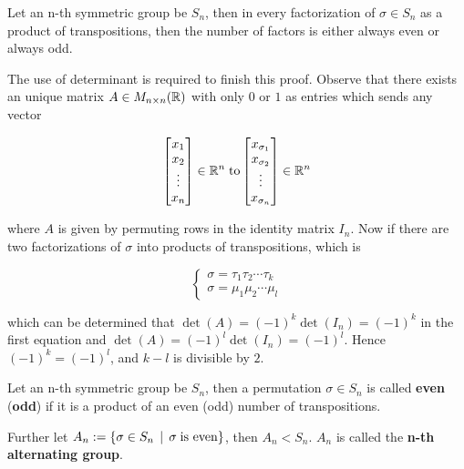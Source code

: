 \documentclass[a4paper,12pt]{article}
\begin{document}
\begin{pst}
  Let an n-th symmetric group be $S_{n}$, then in every factorization of $\sigma\in S_{n}$ as a product of transpositions, then the number of factors is either always even or always odd.\n

  \prf The use of determinant is required to finish this proof. Observe that there exists an unique matrix $A\in M_{n\times n}(\mathbb{R})$ with only $0$ or $1$ as entries which sends any vector

  $$\left[ \begin{matrix}
    x_{1}\\
    x_{2}\\
    \vdots\\
    x_{n}\\
  \end{matrix}\right]\in\mathbb{R}^{n}\;\text{to}\left[ \begin{matrix}
    x_{\sigma_{1}}\\
    x_{\sigma_{2}}\\
    \vdots\\
    x_{\sigma_{n}}\\
  \end{matrix}\right]\in\mathbb{R}^{n}$$\s

  where $A$ is given by permuting rows in the identity matrix $I_{n}$. Now if there are two factorizations of $\sigma$ into products of transpositions, which is

  $$\begin{cases}
    \sigma=\tau_{1}\tau_{2}\cdots\tau_{k}\\
    \sigma=\mu_{1}\mu_{2}\cdots\mu_{l}
  \end{cases}$$\s

  which can be determined that $\det(A)=(-1)^{k}\det(I_{n})=(-1)^{k}$ in the first equation and $\det(A)=(-1)^{l}\det(I_{n})=(-1)^{l}$. Hence $(-1)^{k}=(-1)^{l}$, and $k-l$ is divisible by $2$.
\end{pst}\n

\begin{dft}
  Let an n-th symmetric group be $S_{n}$, then a permutation $\sigma\in S_{n}$ is called \textbf{even} (\textbf{odd}) if it is a product of an even (odd) number of transpositions.\n

  Further let $A_{n}:=\left\{ \sigma\in S_{n}\,\mid\,\sigma\;\text{is even}\right\}$, then $A_{n}<S_{n}$. $A_{n}$ is called the \textbf{n-th alternating group}.
\end{dft}
\end{document}
